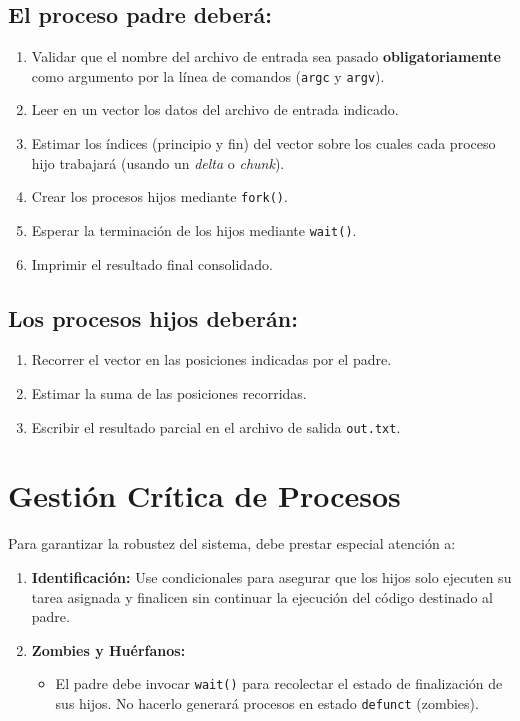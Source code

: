 \documentclass[12pt,a4paper]{article}
\begin{document}
\subsection*{El proceso padre deberá:}
\begin{enumerate}
    \item Validar que el nombre del archivo de entrada sea pasado \textbf{obligatoriamente} como argumento por la línea de comandos (\texttt{argc} y \texttt{argv}).
    \item Leer en un vector los datos del archivo de entrada indicado.
    \item Estimar los índices (principio y fin) del vector sobre los cuales cada proceso hijo trabajará (usando un \textit{delta} o \textit{chunk}).
    \item Crear los procesos hijos mediante \texttt{fork()}.
    \item Esperar la terminación de los hijos mediante \texttt{wait()}.
    \item Imprimir el resultado final consolidado.
\end{enumerate}

\subsection*{Los procesos hijos deberán:}
\begin{enumerate}
    \item Recorrer el vector en las posiciones indicadas por el padre.
    \item Estimar la suma de las posiciones recorridas.
    \item Escribir el resultado parcial en el archivo de salida \texttt{out.txt}.
\end{enumerate}
\newpage

\section*{Gestión Crítica de Procesos}
Para garantizar la robustez del sistema, debe prestar especial atención a:
\begin{enumerate}
    \item \textbf{Identificación:} Use condicionales para asegurar que los hijos solo ejecuten su tarea asignada y finalicen sin continuar la ejecución del código destinado al padre.
    \item \textbf{Zombies y Huérfanos:} 
    \begin{itemize}
        \item El padre debe invocar \texttt{wait()} para recolectar el estado de finalización de sus hijos. No hacerlo generará procesos en estado \texttt{defunct} (zombies).
    \end{itemize}
\end{enumerate}
\end{document}
